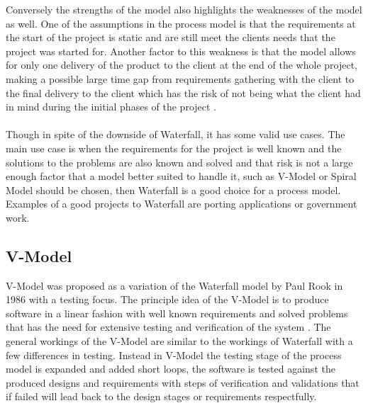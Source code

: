 \documentclass{style/CRPITStyle}
\renewcommand{\cite}{\citep}
\begin{document}
Conversely the strengths of the model also highlights the weaknesses of the model as
well.
One of the assumptions in the process model is that the requirements at the start of the project is
static and are still meet the clients needs that the project was started for.
Another factor to this weakness is that the model allows for only one delivery of the product to
the client at the end of the whole project, making a possible large time gap from requirements 
gathering with the client to the final delivery to the client which has the risk of not being 
what the client had in mind during the initial phases of the project
\cite{McCracken:1982}.

\paragraph{}
Though in spite of the downside of Waterfall, it has some valid use cases.
The main use case is when the requirements for the project is well known and the
solutions to the problems are also known and solved and that risk is not a large
enough factor that a model better suited to handle it, such as V-Model or Spiral
Model should be chosen, then Waterfall is a good choice for a process model.
Examples of a good projects to Waterfall are porting applications or government
work.

\subsection{V-Model} %

V-Model was proposed as a variation of the Waterfall model by Paul Rook in 1986
\cite{rook:1986:vmodel} with a testing focus.
The principle idea of the V-Model is to produce software in a linear fashion with
well known requirements and solved problems that has the need for extensive testing 
and verification of the system \cite{rook:1986:vmodel}.
The general workings of the V-Model are similar to the workings of Waterfall
with a few differences in testing.
Instead in V-Model the testing stage of the process model is expanded and added short loops,
the software is tested against the produced designs and requirements with
steps of verification and validations  that if failed will lead back to the design
stages or requirements respectfully.
\end{document}
